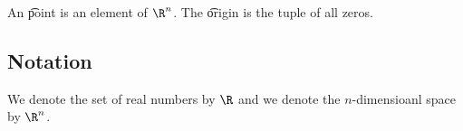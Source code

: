 


An \t{point} is an element of $\R^n$.
The \t{origin} is the tuple of all zeros.

\subsection{Notation}

We denote the set of real
numbers by $\R$ and we denote
the $n$-dimensioanl space by $\R^n$.
